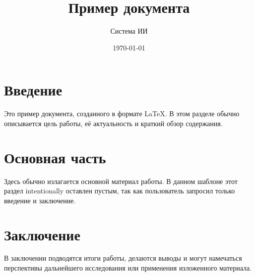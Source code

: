 \documentclass{article}
\title{Пример документа}
\author{Система ИИ}
\date{\today}
\begin{document}
\maketitle

\section{Введение}
Это пример документа, созданного в формате LaTeX. В этом разделе обычно описывается цель работы, её актуальность и краткий обзор содержания.

\section{Основная часть}
Здесь обычно излагается основной материал работы. В данном шаблоне этот раздел intentionally оставлен пустым, так как пользователь запросил только введение и заключение.

\section{Заключение}
В заключении подводятся итоги работы, делаются выводы и могут намечаться перспективы дальнейшего исследования или применения изложенного материала.
\end{document}
